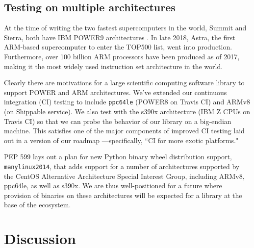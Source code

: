 \subsection*{Testing on multiple architectures}

At the time of writing the two fastest supercomputers in the
world, Summit and Sierra, both have IBM POWER9 architectures
\cite{top500nov2019}. In late 2018, Astra, the first ARM-based
supercomputer to enter the TOP500 list, went into production\cite{
astra-wiki}. Furthermore, over 100 billion ARM processors have been
produced as of 2017\cite{arm-architecture}, making it the most 
widely used instruction set architecture in the world.

Clearly there are motivations for a large scientific computing
software library to support POWER and ARM architectures. We've extended
our continuous integration (CI) testing to include \texttt{ppc64le}
(POWER8 on Travis CI) and ARMv8 (on Shippable service). We also test
with the s390x architecture (IBM Z CPUs on Travis CI) so that we
can probe the behavior of our library on a big-endian machine.
This satisfies one of the major components of
improved CI testing laid out in a version of our roadmap
\cite{numpy-roadmap}---specifically, ``CI for more exotic
platforms."

PEP 599\cite{PEP599} lays out a plan for new Python binary wheel
distribution support, \texttt{manylinux2014}, that adds
support for a number of architectures supported by the CentOS
Alternative Architecture Special Interest Group, including
ARMv8, ppc64le, as well as s390x. We are thus well-positioned
for a future where provision of binaries on these architectures
will be expected for a library at the base of the ecosystem.


\section*{Discussion}


